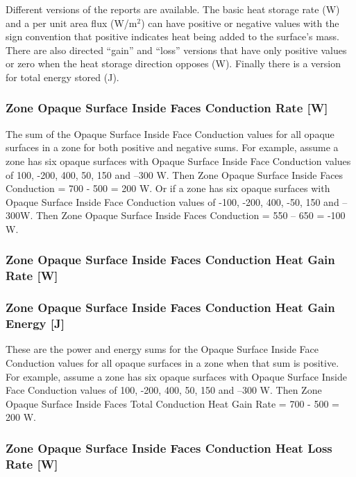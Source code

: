 Different versions of the reports are available. The basic heat storage rate (W) and a per unit area flux (W/m\(^{2}\)) can have positive or negative values with the sign convention that positive indicates heat being added to the surface's mass. There are also directed ``gain'' and ``loss'' versions that have only positive values or zero when the heat storage direction opposes (W). Finally there is a version for total energy stored (J).

\subsubsection{Zone Opaque Surface Inside Faces Conduction Rate {[}W{]}}\label{zone-opaque-surface-inside-face-conduction-w}

The sum of the Opaque Surface Inside Face Conduction values for all opaque surfaces in a zone for both positive and negative sums. For example, assume a zone has six opaque surfaces with Opaque Surface Inside Face Conduction values of 100, -200, 400, 50, 150 and --300 W. Then Zone Opaque Surface Inside Faces Conduction = 700 - 500 = 200 W. Or if a zone has six opaque surfaces with Opaque Surface Inside Face Conduction values of -100, -200, 400, -50, 150 and --300W. Then Zone Opaque Surface Inside Faces Conduction = 550 -- 650 = -100 W.

\subsubsection{Zone Opaque Surface Inside Faces Conduction Heat Gain Rate {[}W{]}}\label{zone-opaque-surface-inside-faces-conduction-heat-gain-rate-w}

\subsubsection{Zone Opaque Surface Inside Faces Conduction Heat Gain Energy {[}J{]}}\label{zone-opaque-surface-inside-faces-conduction-heat-gain-energy-j}

These are the power and energy sums for the Opaque Surface Inside Face Conduction values for all opaque surfaces in a zone when that sum is positive. For example, assume a zone has six opaque surfaces with Opaque Surface Inside Face Conduction values of 100, -200, 400, 50, 150 and --300 W. Then Zone Opaque Surface Inside Faces Total Conduction Heat Gain Rate = 700 - 500 = 200 W.

\subsubsection{Zone Opaque Surface Inside Faces Conduction Heat Loss Rate {[}W{]}}\label{zone-opaque-surface-inside-faces-conduction-heat-loss-rate-w}

